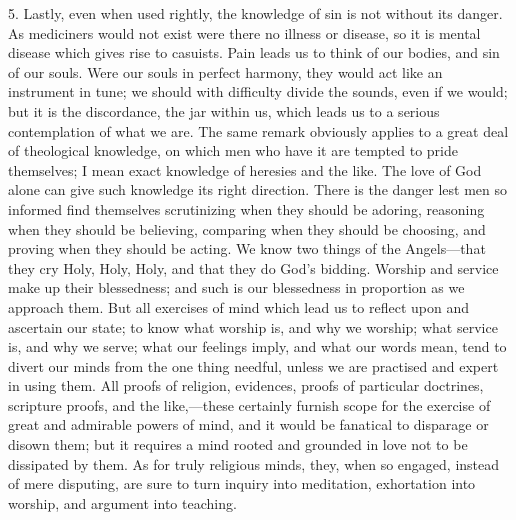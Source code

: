 5. Lastly, even when used rightly, the knowledge of sin is not
without its danger. As mediciners would not exist were there no
illness or disease, so it is mental disease which gives rise to
casuists. Pain leads us to think of our bodies, and sin of our souls.
Were our souls in perfect harmony, they would act like an instrument
in tune; we should with difficulty divide the sounds, even if we
would; but it is the discordance, the jar within us, which leads us to
a serious contemplation of what we are. The same remark obviously
applies to a great deal of theological knowledge, on which men who
have it are tempted to pride themselves; I mean exact knowledge of
heresies and the like. The love of God alone can give such knowledge
its right direction. There is the danger lest men so informed find
themselves scrutinizing when they should be adoring, reasoning when
they should be believing, comparing when they should be choosing, and
proving when they should be acting. We know two things of the Angels—that
they cry Holy, Holy, Holy, and that they do God's bidding. Worship and
service make up their blessedness; and such is our blessedness in
proportion as we approach them. But all exercises of mind which lead
us to reflect upon and ascertain our state; to know what worship is,
and why we worship; what service is, and why we serve; what our
feelings imply, and what our words mean, tend to divert our minds from
the one thing needful, unless we are practised and expert in using
them. All proofs of religion, evidences, proofs of particular
doctrines, scripture proofs, and the like,—these certainly furnish
scope for the exercise of great and admirable powers of mind, and it
would be fanatical to disparage or disown them; but it requires a mind
rooted and grounded in love not to be dissipated by them. As for truly
religious minds, they, when so engaged, instead of mere disputing, are
sure to turn inquiry into meditation, exhortation into worship, and
argument into teaching.

